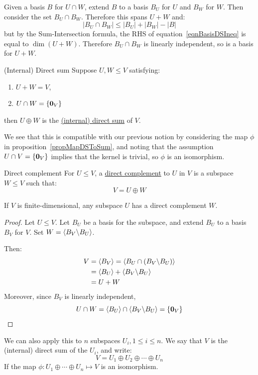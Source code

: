 \documentclass[../Main.tex]{subfiles}
\begin{document}
Given a basis $B$ for $U \cap W$, extend $B$ to a basis $B_U$ for $U$ and $B_W$ for $W$. Then consider the set $B_U \cap B_W$. Therefore this spans $U + W$ and:
\begin{equation}
    |B_U \cap B_W| \leq |B_U| + |B_W| - |B|
    \label{eqnBasisDSIneq}
\end{equation}
but by the Sum-Intersection formula, the RHS of equation~\ref{eqnBasisDSIneq} is equal to $\dim(U + W)$. Therefore $B_U \cap B_W$ is linearly independent, so is a basis for $U + W$.
\begin{definition}{(Internal) Direct sum}
    Suppose $U, W \leq V$ satisfying:
    \begin{enumerate}
        \item $U + W = V$,
        \item $U \cap W = \{\boldsymbol{0}_V\}$
    \end{enumerate} 
    then $U \oplus W$ is the \underline{(internal) direct sum} of $V$.
\end{definition}
We see that this is compatible with our previous notion by considering the map $\phi$ in proposition~\ref{propMapDSToSum}, and noting that the assumption $U \cap V = \{\boldsymbol{0}_V\}$ implies that the kernel is trivial, so $\phi$ is an isomorphism.
\begin{definition}{Direct complement}
    For $U \leq V$, a \underline{direct complement} to $U$ in $V$ is a subspace $W \leq V$ such that:
    \begin{equation*}
        V = U \oplus W
    \end{equation*}
\end{definition}
\begin{proposition}
    If $V$ is finite-dimensional, any subspace $U$ has a direct complement $W$.
    \label{propDCExists}
\end{proposition}
\begin{proof}
    Let $U \leq V$. Let $B_U$ be a basis for the subspace, and extend $B_U$ to a basis $B_V$ for $V$. Set $W = \left\langle B_V \backslash B_U \right\rangle$.

    Then:
    \begin{align*}
        V &= \left\langle B_V \right\rangle = \left\langle B_U \cap (B_V \backslash B_U) \right\rangle \\
        &= \left\langle B_U \right\rangle + \left\langle B_V \backslash B_U \right\rangle \\
        &= U + W
    \end{align*}
    Moreover, since $B_V$ is linearly independent,
    \begin{equation*}
        U \cap W = \left\langle B_U \right\rangle \cap \left\langle B_V \backslash B_U \right\rangle = \{\boldsymbol{0}_V\}
    \end{equation*}
\end{proof}
We can also apply this to $n$ subspaces $U_i, 1 \leq i \leq n$. We say that $V$ is the (internal) direct sum of the $U_i$, and write:
\begin{equation*}
    V = U_1 \oplus U_2 \oplus \cdots \oplus U_n
\end{equation*}
If the map $\phi : U_1 \oplus \cdots \oplus U_n \mapsto V$ is an isomorphism.
\end{document}
